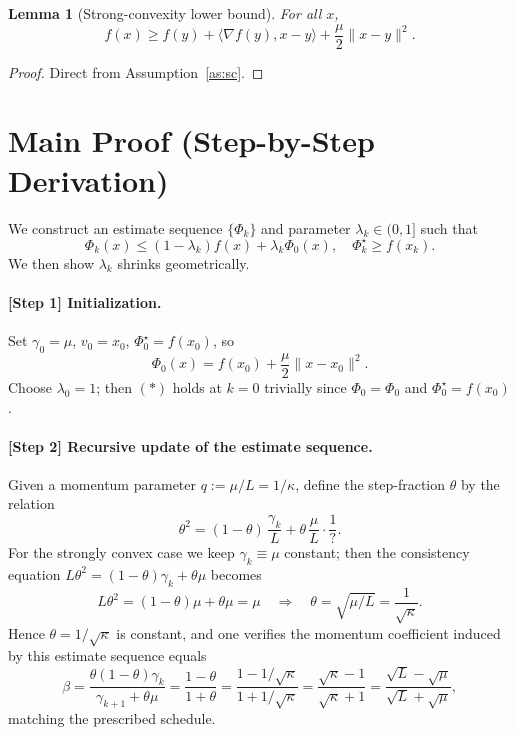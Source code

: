 \documentclass[11pt]{article}
\newtheorem{lemma}{Lemma}
\begin{document}
\begin{lemma}[Strong-convexity lower bound]\label{lem:lower}
For all $x$,
\[
f(x) \ge f(y) + \langle \nabla f(y), x-y\rangle + \frac{\mu}{2}\|x-y\|^2.
\]
\end{lemma}
\begin{proof}
Direct from Assumption~\ref{as:sc}.
\end{proof}

\section*{Main Proof (Step-by-Step Derivation)}

We construct an estimate sequence $\{\Phi_k\}$ and parameter $\lambda_k\in(0,1]$ such that
\[
\Phi_k(x) \le (1-\lambda_k) f(x) + \lambda_k \Phi_0(x), \quad
\Phi_k^\star \ge f(x_k). \tag{$\ast$}
\]
We then show $\lambda_k$ shrinks geometrically.

\paragraph{[Step 1] Initialization.}
Set $\gamma_0 = \mu$, $v_0 = x_0$, $\Phi_0^\star = f(x_0)$, so
\[
\Phi_0(x) = f(x_0) + \frac{\mu}{2}\|x-x_0\|^2 .
\]
Choose $\lambda_0 = 1$; then $(\ast)$ holds at $k=0$ trivially since $\Phi_0=\Phi_0$ and $\Phi_0^\star=f(x_0)$.

\paragraph{[Step 2] Recursive update of the estimate sequence.}
Given a momentum parameter $q := \mu/L = 1/\kappa$, define the step-fraction $\theta$ by the relation
\[
\theta^2 = (1-\theta)\,\frac{\gamma_k}{L} + \theta\,\frac{\mu}{L}\cdot\frac{1}{?}.
\]
For the strongly convex case we keep $\gamma_k \equiv \mu$ constant; then the consistency equation
$L\theta^2 = (1-\theta)\gamma_k + \theta\mu$ becomes
\[
L\theta^2 = (1-\theta)\mu + \theta\mu = \mu
\quad\Longrightarrow\quad
\theta = \sqrt{\mu/L} = \frac{1}{\sqrt{\kappa}}. \tag{Step 2a}
\]
Hence $\theta=1/\sqrt{\kappa}$ is constant, and one verifies the momentum coefficient induced by this estimate sequence equals
\[
\beta = \frac{\theta(1-\theta)\gamma_k}{\gamma_{k+1}+\theta\mu}
= \frac{1-\theta}{1+\theta}
= \frac{1-1/\sqrt{\kappa}}{1+1/\sqrt{\kappa}}
= \frac{\sqrt{\kappa}-1}{\sqrt{\kappa}+1}
= \frac{\sqrt{L}-\sqrt{\mu}}{\sqrt{L}+\sqrt{\mu}}, \tag{Step 2b}
\]
matching the prescribed schedule.
\end{document}
